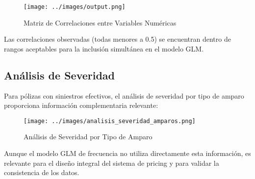\begin{figure}[H]
\centering
\texttt{[image: ../images/output.png]}
\caption{Matriz de Correlaciones entre Variables Numéricas}
\end{figure}

Las correlaciones observadas (todas menores a 0.5) se encuentran dentro de rangos aceptables para la inclusión simultánea en el modelo GLM.

\subsection{Análisis de Severidad}

Para pólizas con siniestros efectivos, el análisis de severidad por tipo de amparo proporciona información complementaria relevante:

\begin{figure}[H]
\centering
\texttt{[image: ../images/analisis\_severidad\_amparos.png]}
\caption{Análisis de Severidad por Tipo de Amparo}
\end{figure}

Aunque el modelo GLM de frecuencia no utiliza directamente esta información, es relevante para el diseño integral del sistema de pricing y para validar la consistencia de los datos.